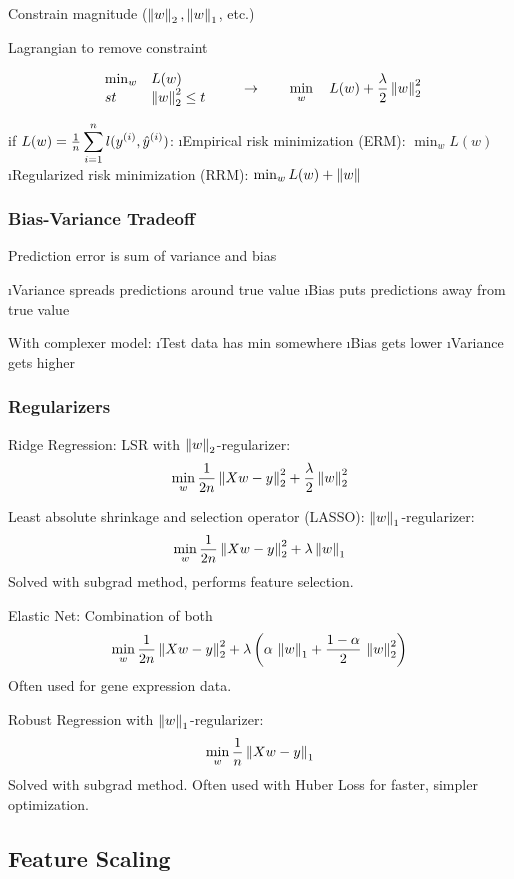 Constrain magnitude ($\left\lVert w\right\rVert_2, \left\lVert w\right\rVert_1$, etc.)

Lagrangian to remove constraint

\[
\begin{array}{ll}
  \min_w & L(w) \\
  st & \left\lVert w\right\rVert_2^2 \leq t
\end{array} \qquad \to \qquad \min_w \quad L(w) + \frac{\lambda}{2} \left\lVert w\right\rVert_2^2
\]

if $L(w) = \frac{1}{n} \displaystyle\sum^n_{{i}=1} l(y^{(i)}, \hat y^{(i)})$:
\be
\i Empirical risk minimization (ERM): \qquad $\min_w L(w)$
\i Regularized risk minimization (RRM): \quad $\min_w L(w) + \left\lVert w\right\rVert$
\ee

\subsubsection{Bias-Variance Tradeoff}

Prediction error is sum of variance and bias

\bi
\i Variance spreads predictions around true value
\i Bias puts predictions away from true value
\ei

With complexer model:
\be
\i Test data has min somewhere
\i Bias gets lower
\i Variance gets higher
\ee

\subsubsection{Regularizers}

Ridge Regression: LSR with $\left\lVert w\right\rVert_2$-regularizer:
\[
\min_w \frac{1}{2n} \left\lVert Xw-y\right\rVert_2^2 + \frac{\lambda}{2} \left\lVert w\right\rVert_2^2
\]

Least absolute shrinkage and selection operator (LASSO): $\left\lVert w\right\rVert_1$-regularizer:
\[
\min_w \frac{1}{2n} \left\lVert Xw-y\right\rVert_2^2 + \lambda \left\lVert w\right\rVert_1
\]
Solved with subgrad method, performs feature selection.

Elastic Net: Combination of both
\[
\min_w \frac{1}{2n} \left\lVert Xw-y\right\rVert^2_2 + \lambda \left( \alpha \, \left\lVert w\right\rVert_1 + \frac{1-\alpha}{2}\, \left\lVert w\right\rVert_2^2\right)
\]
Often used for gene expression data.

Robust Regression with $\left\lVert w\right\rVert_1$-regularizer:
\[
\min_w \frac{1}{n} \left\lVert Xw-y\right\rVert_1
\]
Solved with subgrad method. Often used with Huber Loss for faster, simpler optimization.

\subsection{Feature Scaling}

